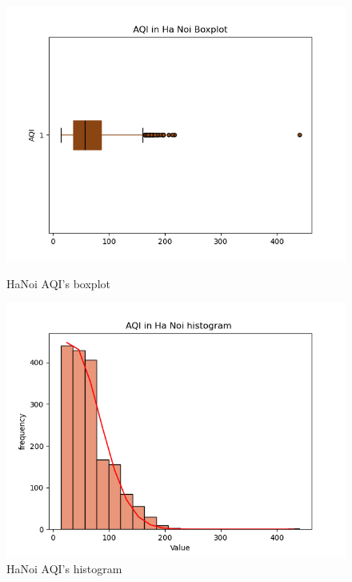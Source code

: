 \documentclass[conference]{IEEEtran}
\begin{document}
\begin{figure}[H]
    \centering
    \begin{minipage}{0.24\textwidth}
        \centering
        \includegraphics[width=1\textwidth]{bibliography/figure/Analysis-Dataset/BoxplotHaNoi.png}
        \caption{HaNoi AQI's boxplot}
        \label{fig:1}
    \end{minipage}
    \hfill
    \begin{minipage}{0.24\textwidth}
        \centering
        \includegraphics[width=1\textwidth]{bibliography/figure/Analysis-Dataset/histogramHaNoi.png}
        \caption{HaNoi AQI's histogram}
        \label{fig:2}
    \end{minipage}
\end{figure}
\end{document}
